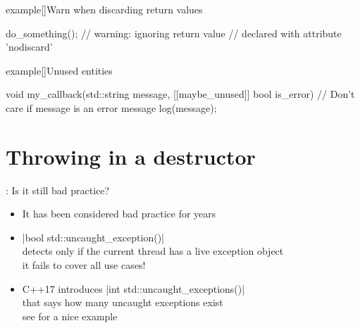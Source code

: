 \begin{frame}[fragile]{}
\begin{onlyenv}
\begin{varblock}{example}[\textwidth]{Warn when discarding return values}
\begin{Cpp}
                do_something(); // warning: ignoring return value
                // declared with attribute 'nodiscard'
            \end{Cpp}
        \end{varblock}
        \bigskip
        \begin{varblock}{example}[\textwidth]{Unused entities}
            \begin{Cpp}
                void my_callback(std::string message,
                                 [[maybe_unused]] bool is_error) {
                    // Don't care if message is an error message
                    log(message);
                }
            \end{Cpp}
        \end{varblock}
    \end{onlyenv}
\end{frame}

\section{Throwing in a destructor}
\begin{frame}[fragile]{\insertsectionhead: Is it still bad practice?}
    \begin{itemize}
        \item It has been considered bad practice for years\\
              \then {}
        \item \CPP|bool std::uncaught_exception()|\\
              detects only if the current thread has a live exception object\\
              \then it fails to cover all use cases!
        \item C++17 introduces \CPP|int std::uncaught_exceptions()|\\
              that says how many uncaught exceptions exist\\
              \then see  for a nice example
    \end{itemize}
\end{frame}

